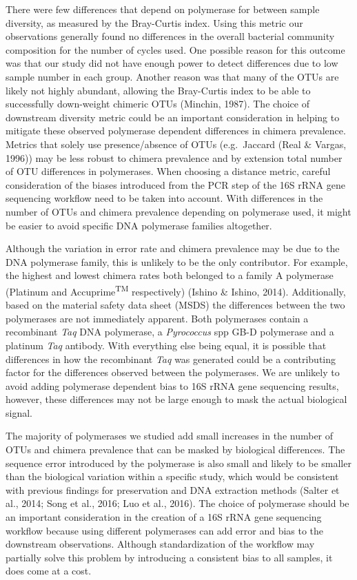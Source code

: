 \documentclass[12pt,]{article}
\begin{document}
There were few differences that depend on polymerase for between sample
diversity, as measured by the Bray-Curtis index. Using this metric our
observations generally found no differences in the overall bacterial
community composition for the number of cycles used. One possible reason
for this outcome was that our study did not have enough power to detect
differences due to low sample number in each group. Another reason was
that many of the OTUs are likely not highly abundant, allowing the
Bray-Curtis index to be able to successfully down-weight chimeric OTUs
(Minchin, 1987). The choice of downstream diversity metric could be an
important consideration in helping to mitigate these observed polymerase
dependent differences in chimera prevalence. Metrics that solely use
presence/absence of OTUs (e.g.~Jaccard (Real \& Vargas, 1996)) may be
less robust to chimera prevalence and by extension total number of OTU
differences in polymerases. When choosing a distance metric, careful
consideration of the biases introduced from the PCR step of the 16S rRNA
gene sequencing workflow need to be taken into account. With differences
in the number of OTUs and chimera prevalence depending on polymerase
used, it might be easier to avoid specific DNA polymerase families
altogether.

Although the variation in error rate and chimera prevalence may be due
to the DNA polymerase family, this is unlikely to be the only
contributor. For example, the highest and lowest chimera rates both
belonged to a family A polymerase (Platinum and
Accuprime\textsuperscript{TM} respectively) (Ishino \& Ishino, 2014).
Additionally, based on the material safety data sheet (MSDS) the
differences between the two polymerases are not immediately apparent.
Both polymerases contain a recombinant \emph{Taq} DNA polymerase, a
\emph{Pyrococcus} spp GB-D polymerase and a platinum \emph{Taq}
antibody. With everything else being equal, it is possible that
differences in how the recombinant \emph{Taq} was generated could be a
contributing factor for the differences observed between the
polymerases. We are unlikely to avoid adding polymerase dependent bias
to 16S rRNA gene sequencing results, however, these differences may not
be large enough to mask the actual biological signal.

The majority of polymerases we studied add small increases in the number
of OTUs and chimera prevalence that can be masked by biological
differences. The sequence error introduced by the polymerase is also
small and likely to be smaller than the biological variation within a
specific study, which would be consistent with previous findings for
preservation and DNA extraction methods (Salter et al., 2014; Song et
al., 2016; Luo et al., 2016). The choice of polymerase should be an
important consideration in the creation of a 16S rRNA gene sequencing
workflow because using different polymerases can add error and bias to
the downstream observations. Although standardization of the workflow
may partially solve this problem by introducing a consistent bias to all
samples, it does come at a cost.
\end{document}
